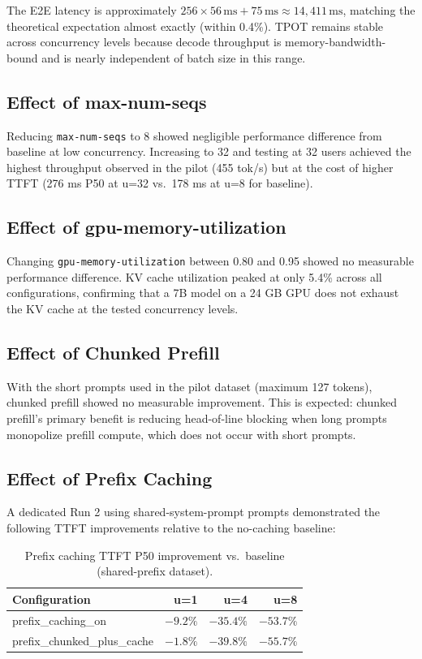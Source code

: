 \documentclass[a4paper,12pt]{report}
\begin{document}
The E2E latency is approximately $256 \times 56\,\text{ms} + 75\,\text{ms} \approx 14{,}411\,\text{ms}$, matching the theoretical expectation almost exactly (within 0.4\%). TPOT remains stable across concurrency levels because decode throughput is memory-bandwidth-bound and is nearly independent of batch size in this range.

\subsection{Effect of max-num-seqs}

Reducing \texttt{max-num-seqs} to 8 showed negligible performance difference from baseline at low concurrency. Increasing to 32 and testing at 32 users achieved the highest throughput observed in the pilot (455 tok/s) but at the cost of higher TTFT (276 ms P50 at u=32 vs.\ 178 ms at u=8 for baseline).

\subsection{Effect of gpu-memory-utilization}

Changing \texttt{gpu-memory-utilization} between 0.80 and 0.95 showed no measurable performance difference. KV cache utilization peaked at only 5.4\% across all configurations, confirming that a 7B model on a 24 GB GPU does not exhaust the KV cache at the tested concurrency levels.

\subsection{Effect of Chunked Prefill}

With the short prompts used in the pilot dataset (maximum 127 tokens), chunked prefill showed no measurable improvement. This is expected: chunked prefill's primary benefit is reducing head-of-line blocking when long prompts monopolize prefill compute, which does not occur with short prompts.

\subsection{Effect of Prefix Caching}

A dedicated Run 2 using shared-system-prompt prompts demonstrated the following TTFT improvements relative to the no-caching baseline:

\begin{table}[h!]
\caption{Prefix caching TTFT P50 improvement vs.\ baseline (shared-prefix dataset).}
\centering
\begin{tabular}{|l|r|r|r|}
\hline
\textbf{Configuration} & \textbf{u=1} & \textbf{u=4} & \textbf{u=8} \\
\hline
prefix\_caching\_on & $-9.2\%$ & $-35.4\%$ & $-53.7\%$ \\
prefix\_chunked\_plus\_cache & $-1.8\%$ & $-39.8\%$ & $-55.7\%$ \\
\hline
\end{tabular}
\label{table:prefix}
\end{table}
\end{document}

